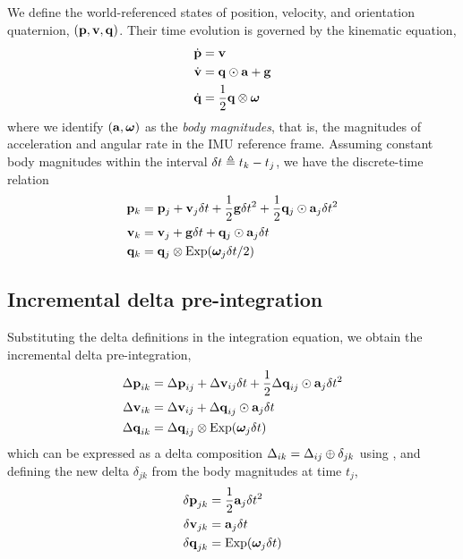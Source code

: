We define the world-referenced states of position, velocity, and orientation quaternion, $({\bf p},{\bf v},{\bf q})$. 
Their time evolution is governed by the kinematic equation,
%
\begin{align}\label{equ:cont_basic}
\dot{{\bf p}} &= {\bf v} \\
\dot{{\bf v}} &= {\bf q}\odot{\bf a} + {\bf g} \\
\dot{{\bf q}} &= \frac12{\bf q}\otimes{{\bm \omega}} 
\end{align}
%
where we identify $({\bf a},{{\bm \omega}})$ as the \emph{body magnitudes}, that is, the magnitudes of acceleration and angular rate in the IMU reference frame.
Assuming constant body magnitudes within the interval $\delta t\triangleq t_k-t_j$, we have the discrete-time relation
%
\begin{align}\label{equ:g_second_order_integration}
\begin{split}
{\bf p}_{k} &= {\bf p}_j + {\bf v}_j\delta t  + \frac12{\bf g}\delta t^2 + \frac12{\bf q}_j\odot{\bf a}_j\delta t^2 \\
{\bf v}_{k} &= {\bf v}_j + {\bf g}\delta t + {\bf q}_j\odot{\bf a}_j\delta t \\
{\bf q}_{k} &= {\bf q}_j\otimes\operatorname*{Exp}({{\bm \omega}}_j\delta t/2) 
\end{split}
\end{align}


\subsection{Incremental delta pre-integration}
%
Substituting the delta definitions in the integration equation, we obtain the incremental delta pre-integration,
%
\begin{align}\label{equ:g_second_order_pre-integration}
\begin{split}
{\Delta{\bf p}}_{ik} 
&= {\Delta{\bf p}}_{ij} + {\Delta{\bf v}}_{ij}\delta t + \frac12{\Delta{\bf q}}_{ij}\odot{\bf a}_j\delta t^2 \\
{\Delta{\bf v}}_{ik} 
&= {\Delta{\bf v}}_{ij} + {\Delta{\bf q}}_{ij}\odot{\bf a}_j\delta t \\
{\Delta{\bf q}}_{ik} 
&= {\Delta{\bf q}}_{ij}\otimes\operatorname*{Exp}({{\bm \omega}}_j\delta t) 
\end{split}
\end{align}
%
which can be expressed as a delta composition $\Delta_{ik}=\Delta_{ij}\oplus\delta_{jk}$ using , and defining the new delta $\delta_{jk}$ from the body magnitudes at time $t_j$,
%
\begin{align}\label{equ:delta_creation}
\begin{split}
{\delta{\bf p}}_{jk} &= \frac12{\bf a}_j\delta t^2 \\
{\delta{\bf v}}_{jk} &= {\bf a}_j\delta t \\
{\delta{\bf q}}_{jk} &= \operatorname*{Exp}({{\bm \omega}}_j\delta t)
\end{split}
\end{align}


